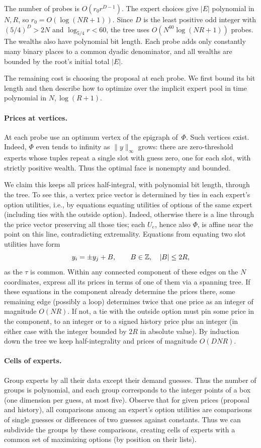 The number of probes is \(O(r_0r^{D-1})\). The expert choices give
\(|E|\) polynomial in \(N,R\), so \(r_0=O(\log(NR+1))\).
Since \(D\) is the least positive odd integer with \((5/4)^D>2N\)
and \(\log_{5/4}r<60\), the tree uses \(O(N^{60}\log(NR+1))\)
probes. The wealths also have polynomial bit length. Each probe adds
only constantly many binary places to a common dyadic denominator,
and all wealths are bounded by the root's initial total \(|E|\).

The remaining cost is choosing the proposal at each probe. We first
bound its bit length and then describe how to optimize over the
implicit expert pool in time polynomial in \(N,\log(R+1)\).

\paragraph{Prices at vertices.}
At each probe use an optimum vertex of the epigraph of~\(\Phi\).
Such vertices exist. Indeed, \(\Phi\) even tends to infinity
as \(\|y\|_\infty\) grows:
there are zero-threshold experts whose tuples
repeat a single slot with guess zero, one for each slot,
with strictly positive wealth.
Thus the optimal face is nonempty and bounded.

We claim this keeps all prices half-integral, with polynomial bit
length, through the tree. To see this, a vertex price vector
is determined by ties in each expert's option utilities, i.e.,
by equations equating utilities of options of the same expert
(including ties with the outside option).
Indeed, otherwise there is a line through the price vector
preserving all those ties; each \(U_e\), hence also \(\Phi\),
is affine near the point on this line, contradicting extremality.
Equations from equating two slot utilities have form
\[
      y_i = \pm y_j + B,\qquad B\in\mathbb Z,\quad |B|\le2R ,
\]
as the \(\tau\) is common. Within any connected component of these edges
on the \(N\) coordinates, express all its prices in terms of
one of them via a spanning tree.
If these equations in the component already determine the prices there,
some remaining edge (possibly a loop) determines twice
that one price as an integer of magnitude \(O(NR)\).
If not, a tie with the outside option must pin some price in the component,
to an integer or to a signed history price plus an integer
(in either case with the integer bounded by \(2R\)
in absolute value).
By induction down the tree we keep half-integrality
and prices of magnitude \(O(DNR)\).

\paragraph{Cells of experts.}
Group experts by all their data except their
demand guesses. Thus the number of groups is polynomial, and
each group corresponds to the integer points of a box
(one dimension per guess, at most five).
Observe that for given prices (proposal and history),
all comparisons among an expert's option utilities are
comparisons of single guesses or differences of two guesses
against constants. Thus we can subdivide the groups
by these comparisons, creating cells of experts with a common
set of maximizing options (by position on their lists).

